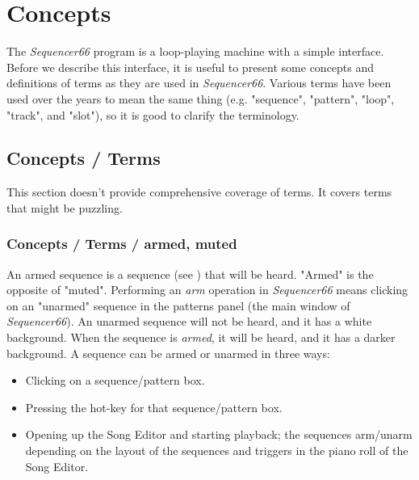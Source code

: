 %
%
%

\section{Concepts}
\label{sec:concepts}

   The \textsl{Sequencer66} program is a loop-playing machine with a 
   simple interface.  Before we describe this interface, it is useful
   to present some concepts and definitions of terms as
   they are used in \textsl{Sequencer66}.  Various terms have been used over
   the years to mean the same thing (e.g. "sequence", "pattern", "loop",
   "track", and "slot"), so it is good to clarify the terminology.

\subsection{Concepts / Terms}
\label{subsec:concepts_terms}

   This section doesn't provide comprehensive coverage of terms.  It
   covers terms that might be puzzling.

\subsubsection{Concepts / Terms / armed, muted}
\label{subsubsec:concepts_terms_armed}

   An armed sequence is a sequence
   (see )
   that will be heard.  "Armed" is the opposite
   of "muted".  Performing an \textsl{arm} operation in \textsl{Sequencer66}
   means clicking on an "unarmed" sequence in the patterns panel (the main
   window of \textsl{Sequencer66}).  An unarmed sequence will not be heard, and
   it has a white background.  When the sequence is \textsl{armed}, it will be
   heard, and it has a darker background.
   A sequence can be armed or unarmed in three ways:

   \begin{itemize}
      \item Clicking on a sequence/pattern box.
      \item Pressing the hot-key for that sequence/pattern box.
      \item Opening up the Song Editor and starting playback; the
            sequences arm/unarm depending on the layout of the
            sequences and triggers in the piano roll of the Song Editor.
   \end{itemize}

